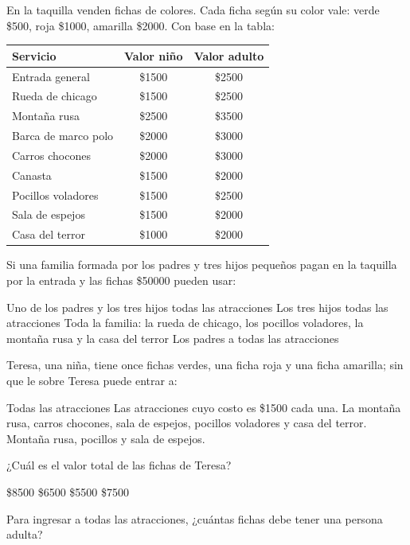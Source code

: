 \documentclass[10pt,letterpaper,addpoints]{exam}
\begin{document}
\begin{questions}
\begin{minipage}{.4\textwidth}
{En la taquilla venden fichas de colores. Cada ficha según su color vale: verde \$500, roja \$1000, amarilla \$2000. Con base en la tabla:}
\end{minipage}\hfill
\begin{minipage}{.5\textwidth}{
\begin{tabular}{|l|c|c|}
\hline 
Servicio & Valor niño & Valor adulto \\ 
\hline 
Entrada general & \$1500 & \$2500 \\ 
\hline 
Rueda de chicago & \$1500 & \$2500 \\ 
\hline 
Montaña rusa & \$2500 & \$3500 \\ 
\hline 
Barca de marco polo & \$2000 & \$3000 \\ 
\hline 
Carros chocones & \$2000 & \$3000 \\ 
\hline 
Canasta & \$1500 & \$2000 \\ 
\hline 
Pocillos voladores & \$1500 & \$2500 \\ 
\hline 
Sala de espejos & \$1500 & \$2000 \\ 
\hline 
Casa del terror & \$1000 & \$2000 \\ 
\hline 
\end{tabular}}
\end{minipage}


\question \label{firstquest}
Si una familia formada por los padres y tres hijos pequeños pagan en la taquilla por la entrada y las fichas \$50000 pueden usar:
\begin{choices}
\choice Uno de los padres y los tres hijos todas las atracciones
\choice Los tres hijos todas las atracciones
\CorrectChoice Toda la familia: la rueda de chicago, los pocillos voladores, la montaña rusa y la casa del terror
\choice Los padres a todas las atracciones
\end{choices}
\question
Teresa, una niña, tiene once fichas verdes, una ficha roja y una ficha amarilla; sin que le sobre Teresa puede entrar a:
\begin{choices}
\choice Todas las atracciones
\choice Las atracciones cuyo costo es \$1500 cada una.
\CorrectChoice La montaña rusa, carros chocones, sala de espejos, pocillos voladores y casa del terror.
\choice Montaña rusa, pocillos y sala de espejos.
\end{choices}
\question
¿Cuál es el valor total de las fichas de Teresa?

\begin{oneparchoices}
\CorrectChoice \$8500
\choice \$6500
\choice \$5500
\choice \$7500
\end{oneparchoices}
\question
Para ingresar a todas las atracciones, ¿cuántas fichas  debe tener una persona adulta?


\end{questions}
\end{document}
